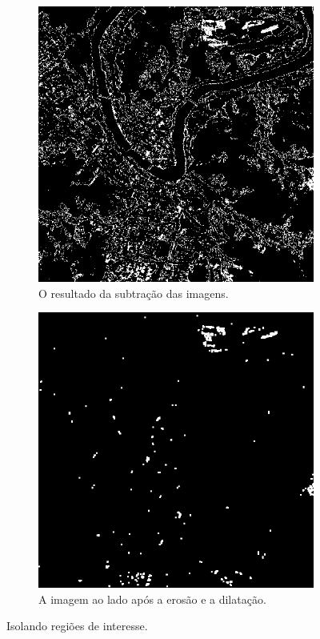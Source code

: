 \documentclass{article}
\begin{document}
\begin{figure}[H]
    \centering
    \begin{subfigure}[b]{0.48\textwidth}
        \includegraphics[width=\textwidth]{../Imagens/012025_sub.png}
        \caption{O resultado da subtração das imagens.}
        \label{2023}
    \end{subfigure}
    \hfill %
    \begin{subfigure}[b]{0.48\textwidth}
        \includegraphics[width=\textwidth]{../Imagens/resultado01.png}
        \caption{A imagem ao lado após a erosão e a dilatação.}
        \label{2025}
    \end{subfigure}
    \caption{Isolando regiões de interesse.}
    \label{resultado}
\end{figure}
\end{document}
